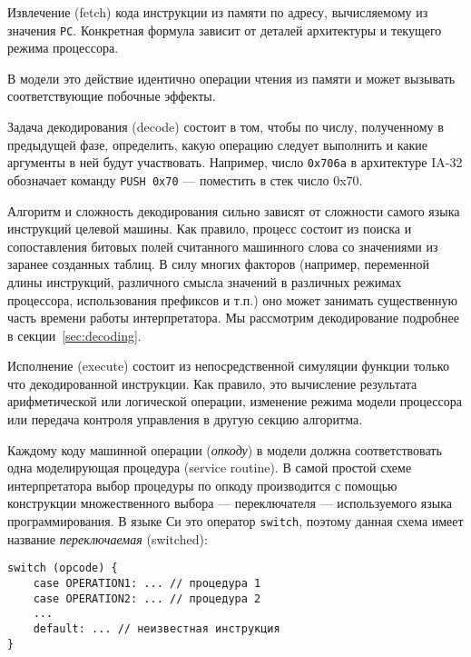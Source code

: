 \begin{enumerate*}

\item Извлечение (\abbr fetch) кода инструкции из памяти по адресу, вычисляемому из значения \texttt{PC}. Конкретная формула зависит от деталей архитектуры и текущего режима процессора. %

В модели это действие идентично операции чтения из памяти и может вызывать соответствующие побочные эффекты.

\item Задача декодирования (\abbr decode) состоит в том, чтобы по числу, полученному в предыдущей фазе, определить, какую операцию следует выполнить и какие аргументы в ней будут участвовать. Например, число \texttt{0x706a} в архитектуре IA-32 обозначает команду \texttt{PUSH 0x70} --- поместить в стек число 0x70. 

Алгоритм и сложность декодирования сильно зависят от сложности самого языка инструкций целевой машины. Как правило, процесс состоит из поиска и сопоставления битовых полей считанного машинного слова  со значениями из заранее созданных таблиц. В силу многих факторов (например, переменной длины инструкций, различного смысла значений в различных режимах процессора, использования префиксов и т.п.) оно может занимать существенную часть времени работы интерпретатора. Мы рассмотрим декодирование подробнее в секции~\ref{sec:decoding}.

\item Исполнение (\abbr execute) состоит из непосредственной симуляции функции только что декодированной инструкции. Как правило, это вычисление результата арифметической или логической операции, изменение режима модели процессора или передача контроля управления в другую секцию алгоритма.

Каждому коду машинной операции (\textit{опкоду}) в модели должна соответствовать одна моделирующая процедура (\abbr service routine). В самой простой схеме интерпретатора выбор процедуры по опкоду производится с помощью конструкции множественного выбора --- переключателя --- используемого языка программирования. В языке Си это оператор \texttt{switch}, поэтому данная схема имеет название \textit{переключаемая} (\abbr switched):

\begin{lstlisting}
switch (opcode) {
    case OPERATION1: ... // процедура 1
    case OPERATION2: ... // процедура 2
    ...
    default: ... // неизвестная инструкция
}
\end{lstlisting}



\end{enumerate*}
